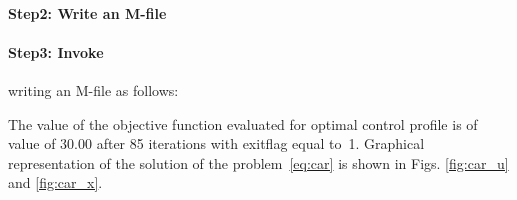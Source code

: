 {\small }

\paragraph{Step2: Write an M-file~}

{\small }

\paragraph{Step3: Invoke~} writing an M-file
 as follows: 

{\small }

The value of the objective function evaluated for optimal control
profile is of value of 30.00 after 85 iterations with exitflag
equal to~1. Graphical representation of the solution of the
problem~\eqref{eq:car} is shown in Figs. \ref{fig:car_u} and
\ref{fig:car_x}.


